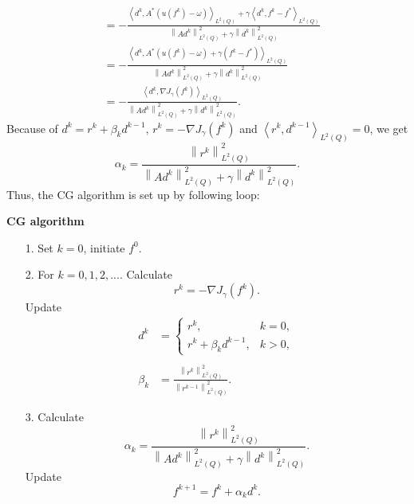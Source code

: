 \documentclass[notitlepage,a4paper,fleqn,9pt]{icmfarticle}
\begin{document}
\begin{multicols}{2}
\begin{align*}
&=-\frac{\displaystyle\left\langle d^k, A^*\left( u(f^k)-\omega\right)\right\rangle_{L^2(Q)}+\gamma\left\langle d^k, f^k-f^*\right\rangle_{L^2(Q)}}{\displaystyle\left\|Ad^k\right\|^2_{L^2(Q)}+\gamma\left\|d^k\right\|^2_{L^2(Q)}}\\[0.2cm]
&=-\frac{\displaystyle\left\langle d^k, A^*\left( u(f^k)-\omega\right)+\gamma(f^k-f^*)\right\rangle_{L^2(Q)}}{\displaystyle\left\|Ad^k\right\|^2_{L^2(Q)}+\gamma\left\|d^k\right\|^2_{L^2(Q)}}\\[0.2cm]
&=-\frac{\left\langle d^k,\nabla J_\gamma(f^k)\right\rangle_{L^2(Q)}}{\displaystyle\left\|Ad^k\right\|^2_{L^2(Q)}+\gamma\left\|d^k\right\|^2_{L^2(Q)}}.
\end{align*}
Because of $d^k=r^k+\beta_kd^{k-1},\, r^k=-\nabla J_\gamma (f^k)$ and $\left\langle r^k,d^{k-1}\right\rangle_{L^2(Q)}=0$, we get 
$$\alpha_k=\frac{\left\|r^k\right\|^2_{L^2(Q)}}{\displaystyle\left\|Ad^k\right\|^2_{L^2(Q)}+\gamma\left\|d^k\right\|^2_{L^2(Q)}}.$$
Thus, the CG algorithm is set up by following loop:

\noindent \textbf{CG algorithm}
\begin{itemize}
	\item[1.] Set $k=0$, initiate $f^0$.
	\item[2.] For $k=0, 1, 2,...$. Calculate
	$$r^k=-\nabla J_\gamma(f^k).$$
	Update\\
	\begin{align*}
	d^k&=\left\{\begin{array}{ll}
	r^k,& k=0,\\
	r^k+\beta_kd^{k-1},& k>0,
	\end{array}\right.\\\\
	\beta_k&=\frac{\left\|r^k\right\|^2_{L^2(Q)}}{\left\|r^{k-1}\right\|^2_{L^2(Q)}}.
	\end{align*}
	\item[3.] Calculate
	$$\alpha_k=\frac{\left\|r^k\right\|^2_{L^2(Q)}}{\displaystyle\left\|Ad^k\right\|^2_{L^2(Q)}+\gamma\left\|d^k\right\|^2_{L^2(Q)}}.$$
	Update
	$$f^{k+1}=f^{k}+\alpha_kd^k.$$
\end{itemize}


\end{multicols}
\end{document}
